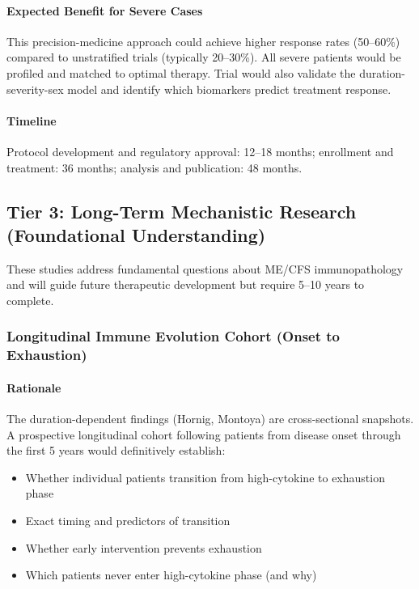 \paragraph{Expected Benefit for Severe Cases}
This precision-medicine approach could achieve higher response rates (50--60\%) compared to unstratified trials (typically 20--30\%). All severe patients would be profiled and matched to optimal therapy. Trial would also validate the duration-severity-sex model and identify which biomarkers predict treatment response.

\paragraph{Timeline}
Protocol development and regulatory approval: 12--18 months; enrollment and treatment: 36 months; analysis and publication: 48 months.

\subsection{Tier 3: Long-Term Mechanistic Research (Foundational Understanding)}
\label{sec:tier3-research}

These studies address fundamental questions about ME/CFS immunopathology and will guide future therapeutic development but require 5--10 years to complete.

\subsubsection{Longitudinal Immune Evolution Cohort (Onset to Exhaustion)}

\paragraph{Rationale}
The duration-dependent findings (Hornig, Montoya) are cross-sectional snapshots. A prospective longitudinal cohort following patients from disease onset through the first 5 years would definitively establish:
\begin{itemize}
    \item Whether individual patients transition from high-cytokine to exhaustion phase
    \item Exact timing and predictors of transition
    \item Whether early intervention prevents exhaustion
    \item Which patients never enter high-cytokine phase (and why)
\end{itemize}

